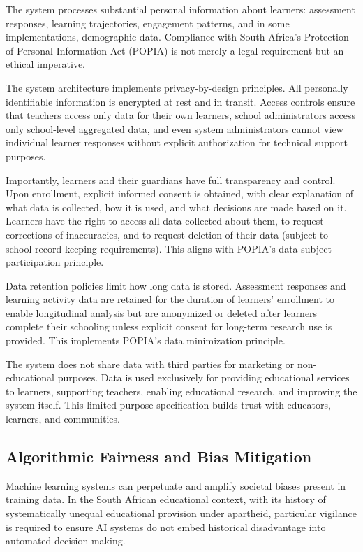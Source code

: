 \documentclass[12pt,a4paper]{article}
\begin{document}
The system processes substantial personal information about learners: assessment responses, learning trajectories, engagement patterns, and in some implementations, demographic data. Compliance with South Africa's Protection of Personal Information Act (POPIA) is not merely a legal requirement but an ethical imperative.

The system architecture implements privacy-by-design principles. All personally identifiable information is encrypted at rest and in transit. Access controls ensure that teachers access only data for their own learners, school administrators access only school-level aggregated data, and even system administrators cannot view individual learner responses without explicit authorization for technical support purposes.

Importantly, learners and their guardians have full transparency and control. Upon enrollment, explicit informed consent is obtained, with clear explanation of what data is collected, how it is used, and what decisions are made based on it. Learners have the right to access all data collected about them, to request corrections of inaccuracies, and to request deletion of their data (subject to school record-keeping requirements). This aligns with POPIA's data subject participation principle.

Data retention policies limit how long data is stored. Assessment responses and learning activity data are retained for the duration of learners' enrollment to enable longitudinal analysis but are anonymized or deleted after learners complete their schooling unless explicit consent for long-term research use is provided. This implements POPIA's data minimization principle.

The system does not share data with third parties for marketing or non-educational purposes. Data is used exclusively for providing educational services to learners, supporting teachers, enabling educational research, and improving the system itself. This limited purpose specification builds trust with educators, learners, and communities.

\subsection{Algorithmic Fairness and Bias Mitigation}

Machine learning systems can perpetuate and amplify societal biases present in training data. In the South African educational context, with its history of systematically unequal educational provision under apartheid, particular vigilance is required to ensure AI systems do not embed historical disadvantage into automated decision-making.
\end{document}
